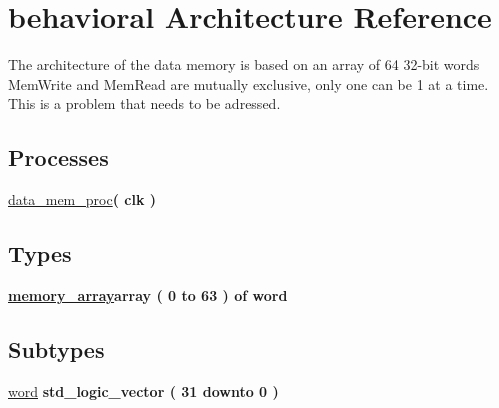 \hypertarget{classdata__memory_1_1behavioral}{\section{behavioral \-Architecture \-Reference}
\label{classdata__memory_1_1behavioral}
}


\-The architecture of the data memory is based on an array of 64 32-\/bit words  \-Mem\-Write and \-Mem\-Read are mutually exclusive, only one can be 1 at a time. \-This is a problem that needs to be adressed.  


\*
\*
\subsection*{\-Processes}
 \begin{DoxyCompactItemize}
\item 
\hyperlink{classdata__memory_1_1behavioral_ac2cd56108b347ccbbc8e30b2581e8080}{data\-\_\-mem\-\_\-proc}{\bfseries  ( {\bfseries clk  } )}
\end{DoxyCompactItemize}
\subsection*{\-Types}
 \begin{DoxyCompactItemize}
\item 
\hypertarget{classdata__memory_1_1behavioral_ac31cac8abdfb8b066dcf91fe2b778136}{{\bfseries \hyperlink{classdata__memory_1_1behavioral_ac31cac8abdfb8b066dcf91fe2b778136}{memory\-\_\-array}{\bfseries array (  0    to    63  )  of word }} }\label{classdata__memory_1_1behavioral_ac31cac8abdfb8b066dcf91fe2b778136}

\end{DoxyCompactItemize}
\subsection*{\-Subtypes}
 \begin{DoxyCompactItemize}
\item 
\hypertarget{classdata__memory_1_1behavioral_a308660f491ef67a20defcc591dfcef4b}{\hyperlink{classdata__memory_1_1behavioral_a308660f491ef67a20defcc591dfcef4b}{word} {\bfseries std\-\_\-logic\-\_\-vector (   31    downto    0  ) } }\label{classdata__memory_1_1behavioral_a308660f491ef67a20defcc591dfcef4b}

\end{DoxyCompactItemize}
